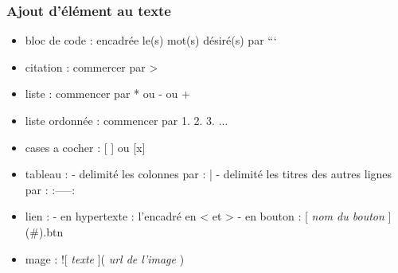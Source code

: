 \subsubsection{Ajout d'élément au texte}
\begin{itemize}
	\item bloc de code : encadrée le(s) mot(s) désiré(s) par ```
	\item citation : commercer par >
	\item liste : commencer par * ou - ou +
	\item liste ordonnée : commencer par 1. 2. 3. ...
	\item cases a cocher : [ ] ou [x]
	\item tableau : 
		- delimité les colonnes par : |
		- delimité les titres des autres lignes par : :-----:
	\item lien : 
		- en hypertexte : l'encadré en < et >
		- en bouton : [ \textit{nom du bouton} ](#){.btn }
	\item mage : ![ \textit{texte} ]( \textit{url de l'image} )
\end{itemize}
